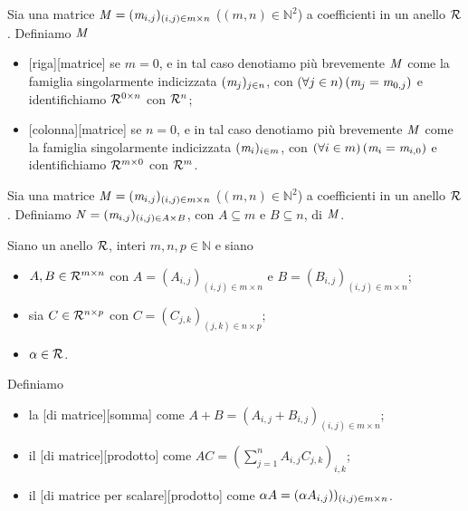 \begin{Definition}
	Sia una matrice $\mathit{M} = (\mathit{m}_{i,j})_{(i,j) \in m \times n}$ ($(m,n) \in \mathbb{N}^2$) a coefficienti in un anello $\mathcal{R}$. Definiamo $\mathit{M}$
	\begin{itemize}
		\item {}[matrice] se $m = 0$, e in tal caso denotiamo pi\`u brevemente $\mathit{M}$ come la famiglia singolarmente indicizzata $(\mathit{m}_j)_{j \in n}$, con $\left ( \forall j \in n \right ) \left ( \mathit{m}_j = \mathit{m}_{0,j} \right )$ e identifichiamo $\mathcal{R}^{0 \times n}$ con $\mathcal{R}^n$;
		\item {}[colonna][matrice] se $n = 0$, e in tal caso denotiamo pi\`u brevemente $\mathit{M}$ come la famiglia singolarmente indicizzata $(\mathit{m}_i)_{i \in m}$, con $\left ( \forall i \in m \right ) \left ( \mathit{m}_i = \mathit{m}_{i,0} \right )$ e identifichiamo $\mathcal{R}^{m \times 0}$ con $\mathcal{R}^m$.
	\end{itemize}
\end{Definition}
\begin{Definition}
	Sia una matrice $\mathit{M} = (\mathit{m}_{i,j})_{(i,j) \in m \times n}$ ($(m,n) \in \mathbb{N}^2$) a coefficienti in un anello $\mathcal{R}$. Definiamo $\mathit{N} = (\mathit{m}_{i,j})_{(i,j) \in A \times B}$, con $A \subseteq m$ e $B \subseteq n$,  di $\mathit{M}$.
\end{Definition}
\begin{Definition}
	Siano un anello $\mathcal{R}$, interi $m, n, p \in \mathbb{N}$ e siano
	\begin{itemize}
		\item $A, B \in \mathcal{R}^{m \times n}$ con $A = (A_{i,j})_{(i,j) \in m \times n}$ e $B = (B_{i,j})_{(i,j) \in m \times n}$;
		\item sia $C \in \mathcal{R}^{n \times p}$ con $C = (C_{j,k})_{(j,k) \in n \times p}$;
		\item $\alpha \in \mathcal{R}$.
	\end{itemize}
	Definiamo
	\begin{itemize}
		\item la [di matrice][somma] come
		$A + B = (A_{i,j} + B_{i,j})_{(i,j) \in m \times n}$;
		\item il [di matrice][prodotto] come
		$AC = (\sum_{j = 1}^n A_{i,j}C_{j,k})_{i,k}$;
		\item il
		[di matrice per scalare][prodotto] come
		$\alpha A = (\alpha A_{i,j}))_{(i,j) \in m \times n}$.
	\end{itemize}
\end{Definition}
